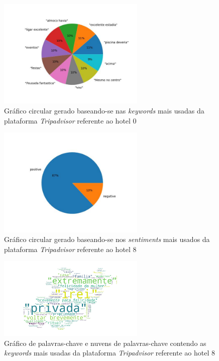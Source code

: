 \begin{figure}[!htb]
\centering
\includegraphics[width=7cm]{figuras/TripAdvisor/Hotels/hotel0_keywords.jpeg}
\caption{Gráfico circular gerado baseando-se nas \textit{keywords} mais usadas da plataforma \textit{Tripadvisor} referente ao hotel 0}
\label{fig:exemplofig}
\end{figure}

\begin{figure}[!htb]
\centering
\includegraphics[width=7cm]{figuras/TripAdvisor/Hotels/hotel8_sentiments.jpeg}
\caption{Gráfico circular gerado baseando-se nos \textit{sentiments} mais usados da plataforma \textit{Tripadvisor} referente ao hotel 8}
\label{fig:exemplofig}
\end{figure}

\begin{figure}[!htb]
\centering
\includegraphics[width=7cm]{figuras/TripAdvisor/Hotels/hotel8_keywordcloud.jpeg}
\caption{Gráfico de palavras-chave e nuvens de palavras-chave contendo as \textit{keywords} mais usadas da plataforma \textit{Tripadvisor} referente ao hotel 8}
\label{fig:exemplofig}
\end{figure}

